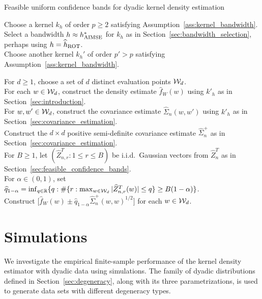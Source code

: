 \begin{algorithm}[ht]
  \caption{Feasible uniform confidence bands for
    dyadic kernel density estimation}
  \label{alg:method}

  Choose a kernel $k_h$ of order $p \geq 2$ satisfying
  Assumption~\ref{ass:kernel_bandwidth}. \\

  Select a bandwidth $h \approx h^*_{\operatorname{AIMSE}}$ for $k_h$
  as in Section~\ref{sec:bandwidth_selection},
  perhaps using $h = \widehat{h}_{\operatorname{ROT}}$. \\

  Choose another kernel $k_h'$ of order $p'>p$ satisfying
  Assumption~\ref{ass:kernel_bandwidth}.

  For $d \geq 1$, choose a set of $d$
  distinct evaluation points $\mathcal{W}_d$. \\

  For each $w \in \mathcal{W}_d$, construct the density estimate $\widehat f_W(w)$
  using $k'_{h}$ as in Section~\ref{sec:introduction}. \\

  For $w, w' \in \mathcal{W}_d$, construct the
  covariance estimate $\widehat \Sigma_n(w,w')$
  using $k'_{h}$ as in Section~\ref{sec:covariance_estimation}. \\

  Construct the $d \times d$ positive semi-definite
  covariance estimate $\widehat \Sigma_n^+$
  as in Section~\ref{sec:covariance_estimation}. \\

  For $B \geq 1$,
  let $(\widehat Z_{n,r}^T: 1\leq r\leq B)$ be i.i.d.\ Gaussian vectors
  from $\widehat{Z}_n^T$ as in
  Section~\ref{sec:feasible_confidence_bands}. \\

  For $\alpha \in (0,1)$, set
  $\widehat q_{1-\alpha} = \inf_{q \in \mathbb{R}}
  \{ q :
  \# \{r: \max_{w\in\mathcal{W}_d}|\widehat Z_{n,r}^T(w)|
  \leq q \}
  \geq B(1-\alpha) \}$. \\

  Construct
  $ \big[\widehat f_W(w) \pm
    \widehat q_{1-\alpha} \widehat\Sigma_n^+(w,w)^{1/2} \big]$
  for each $w \in \mathcal{W}_d$.
\end{algorithm}

\section{Simulations}
\label{sec:simulations}

We investigate the
empirical finite-sample performance of
the kernel density estimator with dyadic data
using simulations.
The family of dyadic distributions
defined in Section~\ref{sec:degeneracy},
along with its three parametrizations,
is used to generate data sets with different degeneracy types.
%

